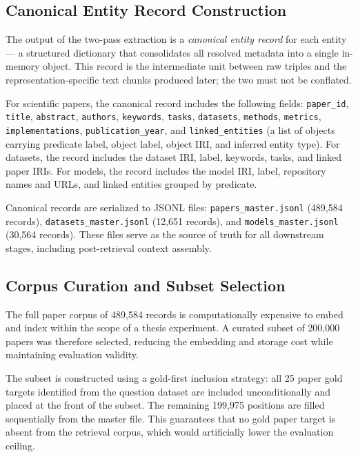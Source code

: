 \subsection{Canonical Entity Record Construction}
\label{subsec:canonical_records}

The output of the two-pass extraction is a \emph{canonical entity record} for
each entity --- a structured dictionary that consolidates all resolved metadata
into a single in-memory object.
This record is the intermediate unit between raw triples and the
representation-specific text chunks produced later; the two must not be
conflated.

For scientific papers, the canonical record includes the following fields:
\texttt{paper\_id}, \texttt{title}, \texttt{abstract}, \texttt{authors},
\texttt{keywords}, \texttt{tasks}, \texttt{datasets}, \texttt{methods},
\texttt{metrics}, \texttt{implementations}, \texttt{publication\_year},
and \texttt{linked\_entities} (a list of objects carrying predicate label,
object label, object IRI, and inferred entity type).
For datasets, the record includes the dataset IRI, label, keywords, tasks,
and linked paper IRIs.
For models, the record includes the model IRI, label, repository names and
URLs, and linked entities grouped by predicate.

Canonical records are serialized to JSONL files:
\texttt{papers\_master.jsonl} (489{,}584 records),
\texttt{datasets\_master.jsonl} (12{,}651 records), and
\texttt{models\_master.jsonl} (30{,}564 records).
These files serve as the source of truth for all downstream stages, including
post-retrieval context assembly.

\subsection{Corpus Curation and Subset Selection}
\label{subsec:corpus_curation}

The full paper corpus of 489{,}584 records is computationally expensive to
embed and index within the scope of a thesis experiment.
A curated subset of 200{,}000 papers was therefore selected, reducing the
embedding and storage cost while maintaining evaluation validity.

The subset is constructed using a gold-first inclusion strategy: all 25 paper
gold targets identified from the question dataset are included unconditionally
and placed at the front of the subset.
The remaining 199{,}975 positions are filled sequentially from the master file.
This guarantees that no gold paper target is absent from the retrieval corpus,
which would artificially lower the evaluation ceiling.


